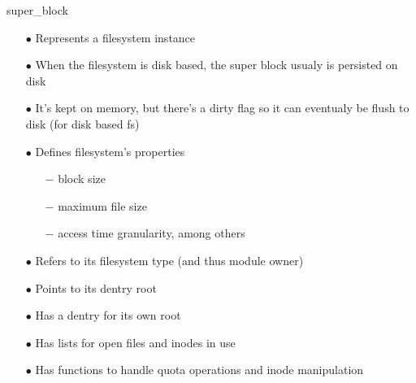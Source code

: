 \documentclass{beamer}
\begin{document}
\begin{frame}{super\_block}
	
	\begin{itemize}[<+->]

		\item[$\bullet$]{Represents a filesystem instance}
		\item[$\bullet$]{When the filesystem is disk based, the super block usualy is persisted on disk}		
		\item[$\bullet$]{It's kept on memory, but there's a dirty flag so it can eventualy be flush to disk (for disk based fs)}
		\item[$\bullet$]{Defines filesystem's properties}
			\begin{itemize}
				\item[$-$]{block size}
				\item[$-$]{maximum file size}
				\item[$-$]{access time granularity, among others}
			\end{itemize}	
		
		\item[$\bullet$]{Refers to its filesystem type (and thus module owner)}
		\item[$\bullet$]{Points to its dentry root}
		\item[$\bullet$]{Has a dentry for its own root}
		\item[$\bullet$]{Has lists for open files and inodes in use}
		\item[$\bullet$]{Has functions to handle quota operations and inode manipulation}
		
	\end{itemize}

\end{frame}
\end{document}
